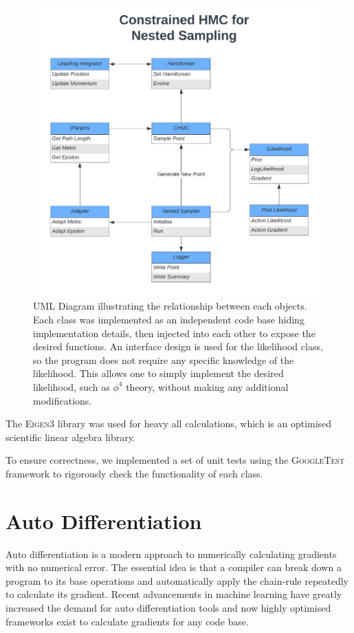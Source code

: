 \documentclass[11pt]{article}
\begin{document}
    \begin{figure}[h!]
        \center
        \includegraphics[width=\linewidth]{../figures/UML_Diagram}
        \caption{
            UML Diagram illustrating the relationship between each objects.
            Each class was implemented as an independent code base hiding implementation details, then injected into
            each other to expose the desired functions.
            An interface design is used for the likelihood class, so the program does not require any specific knowledge
            of the likelihood.
            This allows one to simply implement the desired likelihood, such as $\phi^4$ theory, without making any
            additional modifications.
        }\label{fig:uml_diagram}
    \end{figure}

    The \textsc{Eigen3} library was used for heavy all calculations, which is an optimised scientific
    linear algebra library.

    To ensure correctness, we implemented a set of unit tests using the \textsc{GoogleTest} framework to rigorously
    check the functionality of each class.

\section{Auto Differentiation}\label{sec:autodiff}
    Auto differentiation is a modern approach to numerically calculating gradients with no numerical error.
    The essential idea is that a compiler can break down a program to its base operations and automatically apply the
    chain-rule repeatedly to calculate its gradient.
    Recent advancements in machine learning have greatly increased the demand for auto differentiation tools and now
    highly optimised frameworks exist to calculate gradients for any code base.
\end{document}
